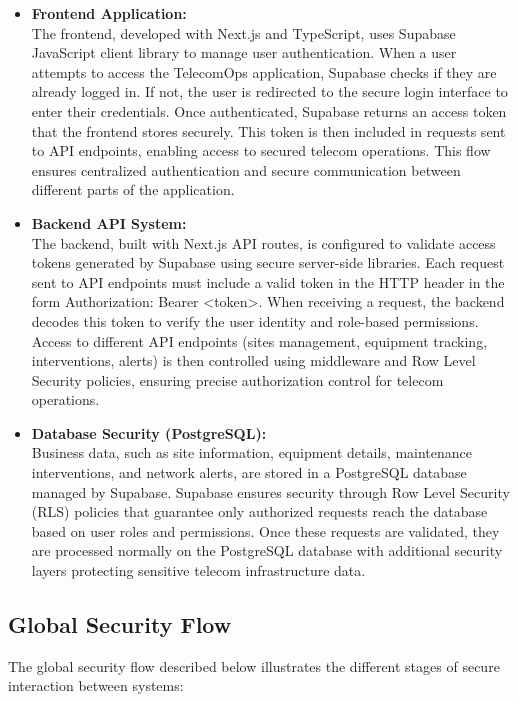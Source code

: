 \begin{itemize}
\item \textbf{Frontend Application:} \\
The frontend, developed with Next.js and TypeScript, uses Supabase JavaScript client library to manage user authentication. When a user attempts to access the TelecomOps application, Supabase checks if they are already logged in. If not, the user is redirected to the secure login interface to enter their credentials. Once authenticated, Supabase returns an access token that the frontend stores securely. This token is then included in requests sent to API endpoints, enabling access to secured telecom operations. This flow ensures centralized authentication and secure communication between different parts of the application.

\vspace{0.5cm}

\item \textbf{Backend API System:} \\
The backend, built with Next.js API routes, is configured to validate access tokens generated by Supabase using secure server-side libraries. Each request sent to API endpoints must include a valid token in the HTTP header in the form Authorization: Bearer <token>. When receiving a request, the backend decodes this token to verify the user identity and role-based permissions. Access to different API endpoints (sites management, equipment tracking, interventions, alerts) is then controlled using middleware and Row Level Security policies, ensuring precise authorization control for telecom operations.

\vspace{0.5cm}

\item \textbf{Database Security (PostgreSQL):} \\
Business data, such as site information, equipment details, maintenance interventions, and network alerts, are stored in a PostgreSQL database managed by Supabase. Supabase ensures security through Row Level Security (RLS) policies that guarantee only authorized requests reach the database based on user roles and permissions. Once these requests are validated, they are processed normally on the PostgreSQL database with additional security layers protecting sensitive telecom infrastructure data.
\end{itemize}

\subsection{Global Security Flow}
The global security flow described below illustrates the different stages of secure interaction between systems:

